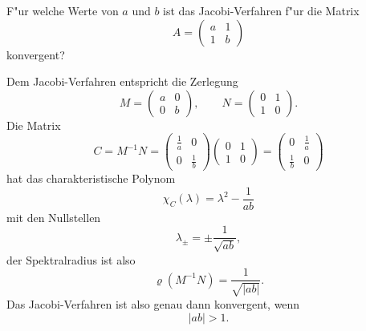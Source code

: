 F"ur welche Werte von $a$ und $b$ ist das Jacobi-Verfahren f"ur die
Matrix
\[
A=\begin{pmatrix}
a&1\\
1&b
\end{pmatrix}
\]
konvergent?

\begin{loesung}
Dem Jacobi-Verfahren entspricht die Zerlegung
\[
M=\begin{pmatrix}a&0\\0&b\end{pmatrix},\qquad
N=\begin{pmatrix}0&1\\1&0\end{pmatrix}.
\]
Die Matrix
\[
C=M^{-1}N
=
\begin{pmatrix}\frac1a&0\\0&\frac1b\end{pmatrix}
\begin{pmatrix}0&1\\1&0\end{pmatrix}
=
\begin{pmatrix}
0&\frac1a\\\frac1b&0
\end{pmatrix}
\]
hat das charakteristische Polynom
\[
\chi_C(\lambda)=\lambda^2 -\frac1{ab}
\]
mit den Nullstellen
\[
\lambda_\pm=\pm\frac1{\sqrt{ab}},
\]
der Spektralradius ist also
\[
\varrho(M^{-1}N)=\frac1{\sqrt{|ab|}}.
\]
Das Jacobi-Verfahren ist also genau dann konvergent, wenn
\[
|ab| > 1.
\]
\end{loesung}

